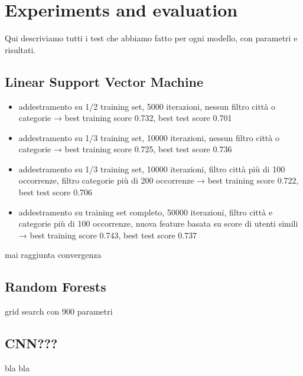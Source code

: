 
\section{Experiments and evaluation}

Qui descriviamo tutti i test che abbiamo fatto per ogni modello, con parametri e risultati.

\subsection{Linear Support Vector Machine}
\begin{itemize}
    \item addestramento su 1/2 training set, 5000 iterazioni, nessun filtro città o categorie → best training score 0.732, best test score 0.701
    \item addestramento su 1/3 training set, 10000 iterazioni, nessun filtro città o categorie → best training score 0.725, best test score 0.736
    \item addestramento su 1/3 training set, 10000 iterazioni, filtro città più di 100 occorrenze, filtro categorie più di 200 occorrenze → best training score 0.722, best test score 0.706
    \item addestramento su training set completo, 50000 iterazioni, filtro città e categorie più di 100 occorrenze, nuova feature basata su score di utenti simili → best training score 0.743, best test score 0.737
\end{itemize}
mai raggiunta convergenza

\subsection{Random Forests}
grid search con 900 parametri

\subsection{CNN???}
bla bla
